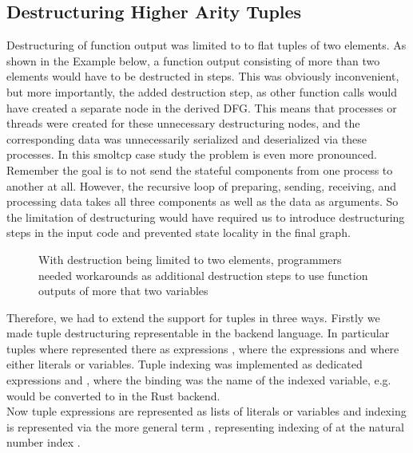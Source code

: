 \subsection{Destructuring Higher Arity Tuples}

Destructuring of function output was limited to to flat tuples of two elements. As shown in the Example below, a function output consisting of more than two elements would have to be destructed in steps. This was obviously inconvenient, but more importantly, the added destruction step, as other function calls would have created a separate node in the derived DFG. This means that processes or threads were created for these unnecessary destructuring nodes, and the corresponding data was unnecessarily serialized and deserialized via these processes. In this smoltcp case study the problem is even more pronounced. Remember the goal is to not send the stateful components from one process to another at all. However, the recursive loop of preparing, sending, receiving, and processing data takes all three components as well as the data as arguments. So the limitation of destructuring would have required us to introduce destructuring steps in the input code and prevented state locality in the final graph. 
\begin{figure}[H]
\centering
\tabskip=0pt
\caption{With destruction being limited to two elements, programmers needed workarounds as additional destruction steps to use function outputs of more that two variables}
\label{fig:DetructExample}
\end{figure}

Therefore, we had to extend the support for tuples in three ways. 
Firstly we made tuple destructuring representable in the backend language. In particular tuples where represented there as expressions , where the expressions  and  where either literals or variables. Tuple indexing was implemented as dedicated expressions  and , where the binding  was the name of the indexed variable, e.g.  would be converted to  in the Rust backend.\\

Now tuple expressions are represented as lists of literals or variables  and indexing is represented via the more general term , representing indexing of  at the natural number index . \\

